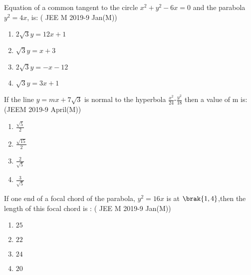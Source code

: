 \item Equation of a common tangent to the circle $x^2+y^2-6x=0$ and the parabola $y^2=4x$, is:
     \hfill{( JEE M 2019-9 Jan(M))}
	  \begin{enumerate}
    		\item $2\sqrt{3}y=12x+1$ 
    		\item $\sqrt{3}y=x+3$
    		\item $2\sqrt{3}y=-x-12$ 
    		\item $\sqrt{3}y=3x+1$
	 \end{enumerate}   
\item If the line $y=mx+7\sqrt{3}$ is normal to the hyperbola $\frac{x^2}{24}$-$\frac{y^2}{18}$ then a value of m is: 
     \hfill{(JEEM 2019-9 April(M))}
	  \begin{enumerate}
    		\item $\frac{\sqrt{5}}{2}$ 
    		\item $\frac{\sqrt{15}}{2}$
    		\item $\frac{2}{\sqrt5}$
    		\item $\frac{3}{\sqrt5}$
	  \end{enumerate}
\item If one end of a focal chord of the parabola, $y^2=16x$ is at $\brak{1,4}$,then the length of this focal chord is :
     \hfill{( JEE M 2019-9 Jan(M))}
	  \begin{enumerate}
    		\item $25$
    		\item $22$
    		\item $24$
    		\item $20$
	  \end{enumerate}

